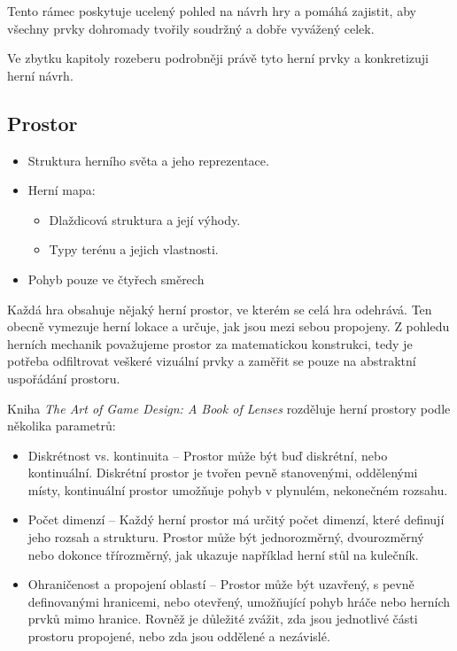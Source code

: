 Tento rámec poskytuje ucelený pohled na návrh hry a pomáhá zajistit, aby všechny prvky dohromady tvořily soudržný a dobře vyvážený celek.

Ve zbytku kapitoly rozeberu podrobněji právě tyto herní prvky a konkretizuji herní návrh.

\subsection{Prostor}
\begin{itemize}
    \item Struktura herního světa a jeho reprezentace.
    \item Herní mapa:
    \begin{itemize}
        \item Dlaždicová struktura a její výhody.
        \item Typy terénu a jejich vlastnosti.
    \end{itemize}
    \item Pohyb pouze ve čtyřech směrech
\end{itemize}

Každá hra obsahuje nějaký herní prostor, ve kterém se celá hra odehrává. Ten obecně vymezuje herní lokace a určuje, jak jsou mezi sebou propojeny. Z pohledu herních mechanik považujeme prostor za matematickou konstrukci, tedy je potřeba odfiltrovat veškeré vizuální prvky a zaměřit se pouze na abstraktní uspořádání prostoru.

Kniha \textit{The Art of Game Design: A Book of Lenses} rozděluje herní prostory podle několika parametrů:

\begin{itemize}
    \item Diskrétnost vs. kontinuita -- Prostor může být buď diskrétní, nebo kontinuální. Diskrétní prostor je tvořen pevně stanovenými, oddělenými místy, kontinuální prostor umožňuje pohyb v plynulém, nekonečném rozsahu.
    \item Počet dimenzí -- Každý herní prostor má určitý počet dimenzí, které definují jeho rozsah a strukturu. Prostor může být jednorozměrný, dvourozměrný nebo dokonce třírozměrný, jak ukazuje například herní stůl na kulečník.
    \item Ohraničenost a propojení oblastí -- Prostor může být uzavřený, s pevně definovanými hranicemi, nebo otevřený, umožňující pohyb hráče nebo herních prvků mimo hranice. Rovněž je důležité zvážit, zda jsou jednotlivé části prostoru propojené, nebo zda jsou oddělené a nezávislé.
\end{itemize}

